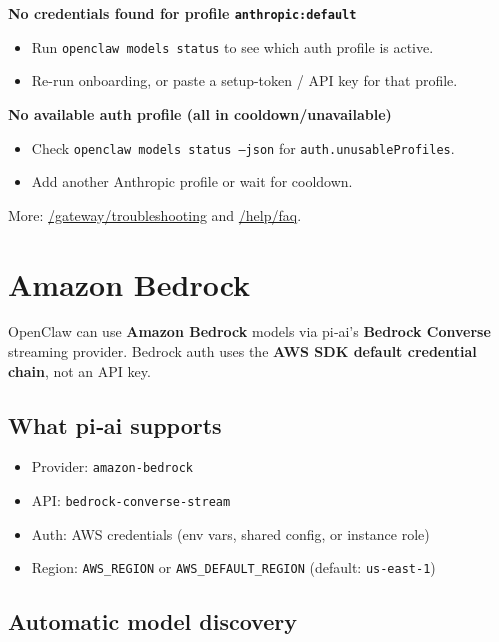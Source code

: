 \textbf{No credentials found for profile \texttt{anthropic:default}}

\begin{itemize}
  \item Run \texttt{openclaw models status} to see which auth profile is active.
  \item Re-run onboarding, or paste a setup-token / API key for that profile.
\end{itemize}


\textbf{No available auth profile (all in cooldown/unavailable)}

\begin{itemize}
  \item Check \texttt{openclaw models status --json} for \texttt{auth.unusableProfiles}.
  \item Add another Anthropic profile or wait for cooldown.
\end{itemize}


More: \href{/gateway/troubleshooting}{/gateway/troubleshooting} and \href{/help/faq}{/help/faq}.


\clearpage

\section{Amazon Bedrock}


OpenClaw can use \textbf{Amazon Bedrock} models via pi‑ai’s \textbf{Bedrock Converse}
streaming provider. Bedrock auth uses the \textbf{AWS SDK default credential chain},
not an API key.

\subsection{What pi‑ai supports}


\begin{itemize}
  \item Provider: \texttt{amazon-bedrock}
  \item API: \texttt{bedrock-converse-stream}
  \item Auth: AWS credentials (env vars, shared config, or instance role)
  \item Region: \texttt{AWS\_REGION} or \texttt{AWS\_DEFAULT\_REGION} (default: \texttt{us-east-1})
\end{itemize}


\subsection{Automatic model discovery}



